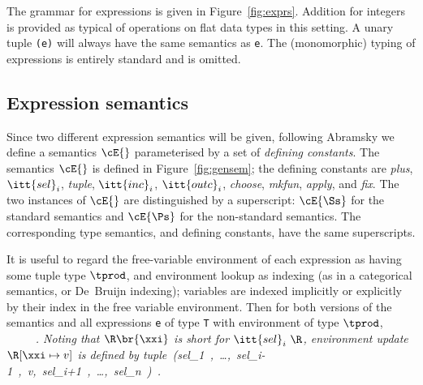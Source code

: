 \documentclass[11pt]{article}
\begin{document}
The grammar for expressions is given in Figure~\ref{fig:exprs}.
Addition for integers is provided as typical of operations on flat data
types in this setting.  A unary tuple \mbox{\tt (e)} will always have the same
semantics as \mbox{\tt e}.  The (monomorphic) typing of expressions is entirely
standard and is omitted.

\subsection{Expression semantics}
Since two different expression semantics will be given, following
Abramsky \cite{Abr90} we define a semantics $\cE{}$ parameterised by a
set of {\it defining constants}.  The semantics $\cE{}$ is defined in
Figure~\ref{fig:gensem}; the defining constants are {\it plus},
$\itt{sel}_i$, {\it tuple}, $\itt{inc}_i$, $\itt{outc}_i$, {\it
choose}, {\it mkfun}, {\it apply}, and {\it fix}.  The two instances
of $\cE{}$ are distinguished by a superscript: $\cE{\Ss}$ for the
standard semantics and $\cE{\Ps}$ for the non-standard semantics.  The
corresponding type semantics, and defining constants, have the same 
superscripts.

It is useful to regard the free-variable environment of each
expression as having some tuple type $\tprod$, and environment lookup
as indexing (as in a categorical semantics, or De~Bruijn indexing);
variables are indexed implicitly or explicitly by their index in the
free variable environment.  Then for both versions of the semantics
and all expressions \mbox{\tt e} of type \mbox{\tt T} with environment of type $\tprod$,
\beqs
\it {}\ \in\ \Te{}{\tprod}~\fto~\ .
\eeqs
Noting that $\R\br{\xxi}$ is short for $\itt{sel}_i~\R$, environment
update $\R[\xxi\mapsto{}v]$ is defined by
\beqqs
\it tuple\ (sel_{\rm1}\ \R,\ \ldots,\ sel_{i-{\rm1}}\ \R,\ v,\ sel_{i+{\rm1}}\ \R,\ \ldots,\ sel_n\ \R)\ .
\eeqqs
\end{document}
